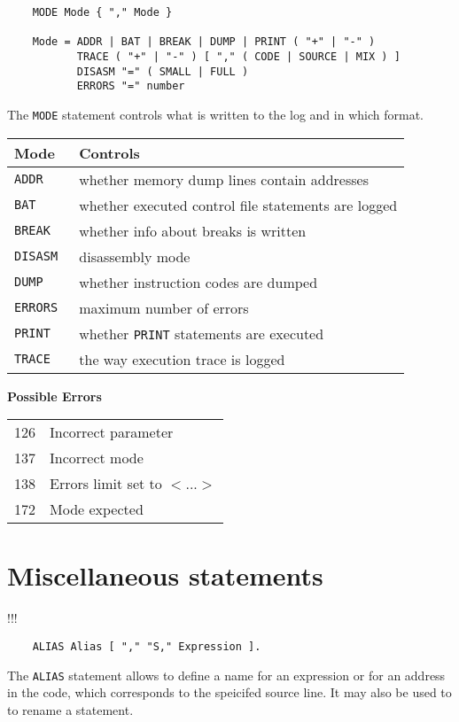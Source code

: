 {\samepage
{}\label{batch:MODE}
\begin{verbatim}
    MODE Mode { "," Mode }

    Mode = ADDR | BAT | BREAK | DUMP | PRINT ( "+" | "-" )
           TRACE ( "+" | "-" ) [ "," ( CODE | SOURCE | MIX ) ]
           DISASM "=" ( SMALL | FULL )
           ERRORS "=" number
\end{verbatim}
The \verb'MODE' statement controls what is written to the log and in
which format.
} %
\begin{tabular}{ll}
\bf Mode & Controls \\ %
\hline
\tt ADDR   & whether memory dump lines contain addresses \\
\tt BAT    & whether executed control file statements are logged \\
\tt BREAK  & whether info about breaks is written \\
\tt DISASM & disassembly mode \\
\tt DUMP   & whether instruction codes are dumped \\
\tt ERRORS & maximum number of errors \\
\tt PRINT  & whether {\tt PRINT} statements are executed \\
\tt TRACE  & the way execution trace is logged
\end{tabular}

{\samepage
{\bf Possible Errors}
\begin{flushleft}
\begin{tabular}{ll}
126 & Incorrect parameter \\
137 & Incorrect mode \\
138 & Errors limit set to $<$...$>$ \\
172 & Mode expected
\end{tabular}
\end{flushleft}
} %
{} %

\section{Miscellaneous statements}

\ifcomment !!!
{\samepage
{}\label{batch:ALIAS}
\begin{verbatim}
    ALIAS Alias [ "," "S," Expression ].
\end{verbatim}
The \verb'ALIAS' statement allows to define a name for an expression or
for an address in the code, which corresponds to the speicifed source line.
It may also be used to to rename a statement.
} %

